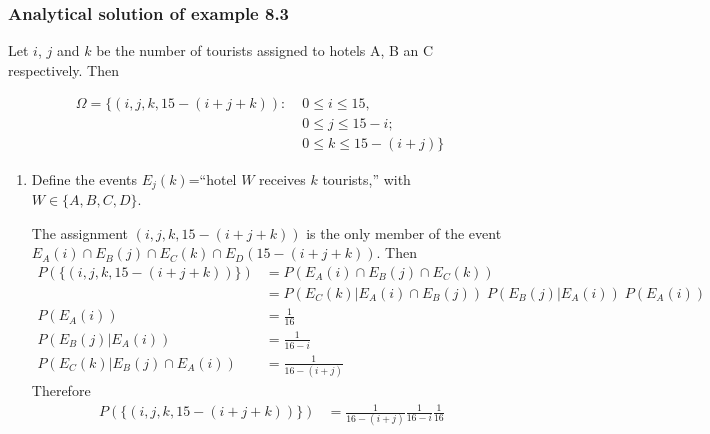 \begin{frame}
    \frametitle{Analytical solution of example 8.3}

    \tiny
    Let $i$, $j$ and $k$ be the number of tourists assigned to hotels A, B an C
    respectively. Then 

    \begin{align*}
        \Omega=\{(i,j,k,15-(i+j+k)):\;&0\le i\le 15,\\
                                      &0\le j\le 15-i;\\
                                      &0\le k\le 15-(i+j)\}
    \end{align*}

    \begin{enumerate}[a]

		\item Define the events $E_j(k)$=``hotel $W$ receives $k$ tourists,''
with $W\in\{A,B,C,D\}$.

			The assignment $(i,j,k,15-(i+j+k))$ is the only member of the
            event $E_A(i)\cap E_B(j)\cap E_C(k)\cap E_D(15-(i+j+k))$. Then
            \begin{align*}
                P(\{(i,j,k,15-(i+j+k))\})&=P(E_A(i)\cap E_B(j)\cap E_C(k))\\
                                         &=P(E_C(k)|E_A(i)\cap
                                         E_B(j))\;P(E_B(j)|E_A(i))\;P(E_A(i))\\
                P(E_A(i))&=\frac{1}{16}\\
                P(E_B(j)|E_A(i))&=\frac{1}{16-i}\\
                P(E_C(k)|E_B(j)\cap E_A(i))&=\frac{1}{16-(i+j)}
            \end{align*}
            Therefore
            \begin{align*}
                P(\{(i,j,k,15-(i+j+k))\})&=\frac{1}{16-(i+j)}\frac{1}{16-i}\frac{1}{16}
            \end{align*}
		\seti
    \end{enumerate}
    \normalsize

\end{frame}

